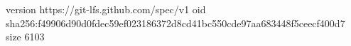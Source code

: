 version https://git-lfs.github.com/spec/v1
oid sha256:f49906d90d0fdec59ef023186372d8cd41bc550cde97aa683448f5ceecf400d7
size 6103
